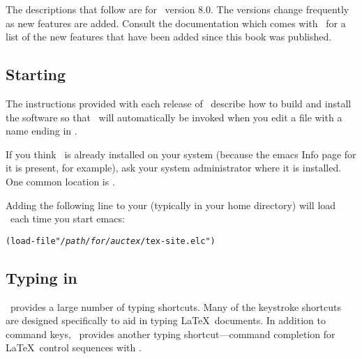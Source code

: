 The descriptions that follow are for \auctex\ version 8.0.
The versions
change frequently as new features are added. Consult the documentation
which comes with \auctex\ for a list of the new features that have been
added since this book was published.


\subsection{Starting \auctex}

The instructions provided with each release of \auctex\ describe how to build
and install the software so that \auctex\ will 
automatically be invoked when 
you edit a file with a name ending in .

If you think \auctex\ is already installed on your system (because the
emacs Info page for it is present, for example), ask your system administrator
where it is installed.  One common location is 
.

Adding the following line 
to your  (typically 
 in your home directory) will load \auctex\ each time
you start emacs:

\begin{exindent}
\begin{alltt}
  (load-file "\textit{/path/for/auctex}/tex-site.elc")
\end{alltt}
\end{exindent}

\subsection{Typing in \auctex}

\auctex\ provides a large number of typing shortcuts.  Many of the
keystroke shortcuts are designed specifically to aid in typing
\LaTeX\ documents.
In addition to command keys, \auctex\ provides another typing
shortcut---command completion for 
\LaTeX\ control sequences with
 .

